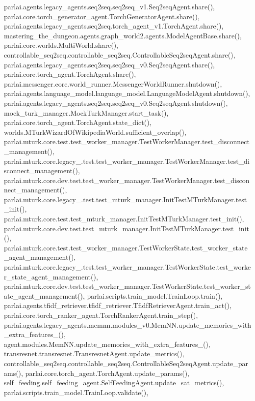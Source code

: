 parlai.\+agents.\+legacy\+\_\+agents.\+seq2seq.\+seq2seq\+\_\+v1.\+Seq2seq\+Agent.\+share(), parlai.\+core.\+torch\+\_\+generator\+\_\+agent.\+Torch\+Generator\+Agent.\+share(), parlai.\+agents.\+legacy\+\_\+agents.\+seq2seq.\+torch\+\_\+agent\+\_\+v1.\+Torch\+Agent.\+share(), mastering\+\_\+the\+\_\+dungeon.\+agents.\+graph\+\_\+world2.\+agents.\+Model\+Agent\+Base.\+share(), parlai.\+core.\+worlds.\+Multi\+World.\+share(), controllable\+\_\+seq2seq.\+controllable\+\_\+seq2seq.\+Controllable\+Seq2seq\+Agent.\+share(), parlai.\+agents.\+legacy\+\_\+agents.\+seq2seq.\+seq2seq\+\_\+v0.\+Seq2seq\+Agent.\+share(), parlai.\+core.\+torch\+\_\+agent.\+Torch\+Agent.\+share(), parlai.\+messenger.\+core.\+world\+\_\+runner.\+Messenger\+World\+Runner.\+shutdown(), parlai.\+agents.\+language\+\_\+model.\+language\+\_\+model.\+Language\+Model\+Agent.\+shutdown(), parlai.\+agents.\+legacy\+\_\+agents.\+seq2seq.\+seq2seq\+\_\+v0.\+Seq2seq\+Agent.\+shutdown(), mock\+\_\+turk\+\_\+manager.\+Mock\+Turk\+Manager.\+start\+\_\+task(), parlai.\+core.\+torch\+\_\+agent.\+Torch\+Agent.\+state\+\_\+dict(), worlds.\+M\+Turk\+Wizard\+Of\+Wikipedia\+World.\+sufficient\+\_\+overlap(), parlai.\+mturk.\+core.\+test.\+test\+\_\+worker\+\_\+manager.\+Test\+Worker\+Manager.\+test\+\_\+disconnect\+\_\+management(), parlai.\+mturk.\+core.\+legacy\+\_.\+test.\+test\+\_\+worker\+\_\+manager.\+Test\+Worker\+Manager.\+test\+\_\+disconnect\+\_\+management(), parlai.\+mturk.\+core.\+dev.\+test.\+test\+\_\+worker\+\_\+manager.\+Test\+Worker\+Manager.\+test\+\_\+disconnect\+\_\+management(), parlai.\+mturk.\+core.\+legacy\+\_.\+test.\+test\+\_\+mturk\+\_\+manager.\+Init\+Test\+M\+Turk\+Manager.\+test\+\_\+init(), parlai.\+mturk.\+core.\+test.\+test\+\_\+mturk\+\_\+manager.\+Init\+Test\+M\+Turk\+Manager.\+test\+\_\+init(), parlai.\+mturk.\+core.\+dev.\+test.\+test\+\_\+mturk\+\_\+manager.\+Init\+Test\+M\+Turk\+Manager.\+test\+\_\+init(), parlai.\+mturk.\+core.\+test.\+test\+\_\+worker\+\_\+manager.\+Test\+Worker\+State.\+test\+\_\+worker\+\_\+state\+\_\+agent\+\_\+management(), parlai.\+mturk.\+core.\+legacy\+\_.\+test.\+test\+\_\+worker\+\_\+manager.\+Test\+Worker\+State.\+test\+\_\+worker\+\_\+state\+\_\+agent\+\_\+management(), parlai.\+mturk.\+core.\+dev.\+test.\+test\+\_\+worker\+\_\+manager.\+Test\+Worker\+State.\+test\+\_\+worker\+\_\+state\+\_\+agent\+\_\+management(), parlai.\+scripts.\+train\+\_\+model.\+Train\+Loop.\+train(), parlai.\+agents.\+tfidf\+\_\+retriever.\+tfidf\+\_\+retriever.\+Tfidf\+Retriever\+Agent.\+train\+\_\+act(), parlai.\+core.\+torch\+\_\+ranker\+\_\+agent.\+Torch\+Ranker\+Agent.\+train\+\_\+step(), parlai.\+agents.\+legacy\+\_\+agents.\+memnn.\+modules\+\_\+v0.\+Mem\+N\+N.\+update\+\_\+memories\+\_\+with\+\_\+extra\+\_\+features\+\_\+(), agent.\+modules.\+Mem\+N\+N.\+update\+\_\+memories\+\_\+with\+\_\+extra\+\_\+features\+\_\+(), transresnet.\+transresnet.\+Transresnet\+Agent.\+update\+\_\+metrics(), controllable\+\_\+seq2seq.\+controllable\+\_\+seq2seq.\+Controllable\+Seq2seq\+Agent.\+update\+\_\+params(), parlai.\+core.\+torch\+\_\+agent.\+Torch\+Agent.\+update\+\_\+params(), self\+\_\+feeding.\+self\+\_\+feeding\+\_\+agent.\+Self\+Feeding\+Agent.\+update\+\_\+sat\+\_\+metrics(), parlai.\+scripts.\+train\+\_\+model.\+Train\+Loop.\+validate(), 